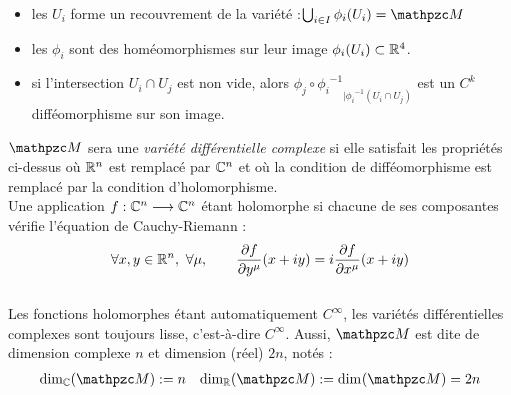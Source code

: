 \begin{annexe}
\begin{itemize}
	\item les $U_i$ forme un recouvrement de la variété :\qquad $\bigcup_{i\in I} \phi_i(U_i) = \manu$
	
	\item les $\phi_i$ sont des homéomorphismes sur leur image $\phi_i(U_i)\subset\mathbb{R}^4$.
	
	\item si l'intersection $U_i \cap U_j$ est non vide, alors ${\phi_j \circ {\phi_i}^{-1}}_{| {\phi_i}^{-1}(U_i\cap U_j)}$ est un $C^k$ difféomorphisme sur son image.
\end{itemize}

$\manu$ sera une \emph{variété différentielle complexe} si elle satisfait les propriétés ci-dessus où $\mathbb{R}^n$ est remplacé par $\mathbb{C}^n$ et où la condition de difféomorphisme est remplacé par la condition d'holomorphisme. 
\\
Une application $f : \mathbb{C}^n\longrightarrow \mathbb{C}^n$ étant holomorphe si chacune de ses composantes vérifie l'équation de Cauchy-Riemann :
\[\forall x,y\in\R^n,\ \forall \mu,\qquad \frac{\partial f }{\partial y^\mu}(x+iy) = i \frac{\partial f }{\partial x^\mu}(x+iy)\]
\\
Les fonctions holomorphes étant automatiquement $C^\infty$, les variétés différentielles complexes sont toujours lisse, c'est-à-dire $C^\infty$. Aussi, $\manu$ est dite de dimension complexe $n$ et dimension (réel) $2n$, notés :
\begin{align}\label{eq:manuC-base_cano}
	\dim[\C](\manu) &\defeq n  &  \dim[\R] (\manu) \defeq \dim (\manu) = 2n
\end{align}
\\


\end{annexe}
